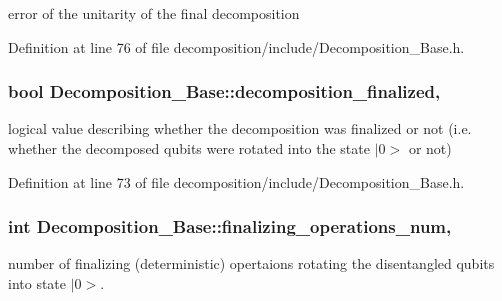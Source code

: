 error of the unitarity of the final decomposition 



Definition at line 76 of file decomposition/include/\+Decomposition\+\_\+\+Base.\+h.

\subsubsection[{\texorpdfstring{decomposition\+\_\+finalized}{decomposition_finalized}}]{\setlength{\rightskip}{0pt plus 5cm}bool Decomposition\+\_\+\+Base\+::decomposition\+\_\+finalized\hspace{0.3cm}{\ttfamily [protected]}, {\ttfamily [inherited]}}\hypertarget{class_decomposition___base_a488bfdaecfefa4fb9fb3149657b40b6d}{}\label{class_decomposition___base_a488bfdaecfefa4fb9fb3149657b40b6d}


logical value describing whether the decomposition was finalized or not (i.\+e. whether the decomposed qubits were rotated into the state $\vert$0$>$ or not) 



Definition at line 73 of file decomposition/include/\+Decomposition\+\_\+\+Base.\+h.

\subsubsection[{\texorpdfstring{finalizing\+\_\+operations\+\_\+num}{finalizing_operations_num}}]{\setlength{\rightskip}{0pt plus 5cm}int Decomposition\+\_\+\+Base\+::finalizing\+\_\+operations\+\_\+num\hspace{0.3cm}{\ttfamily [protected]}, {\ttfamily [inherited]}}\hypertarget{class_decomposition___base_a0685291401fc40fee1121eddba63a429}{}\label{class_decomposition___base_a0685291401fc40fee1121eddba63a429}


number of finalizing (deterministic) opertaions rotating the disentangled qubits into state $\vert$0$>$. 



